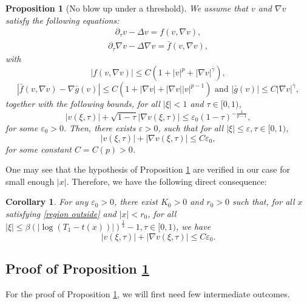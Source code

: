 \documentclass[11pt,a4paper]{article}
\newcommand{\1}{\mathbbm{1}}
\numberwithin{equation}{section}
\newtheorem{prp}[lemma]{Proposition}
\newtheorem{cor}[lemma]{Corollary}
\theoremstyle{remark}
\begin{document}
\begin{prp}[No blow up under a threshold]\label{prp bound v}
We assume that $v$ and $\nabla v$ satisfy the following equations:
\begin{equation}\label{ineq v}
\begin{split}
\partial_\tau v -\Delta v=f(v,\nabla v),
\end{split}
\end{equation}
\begin{equation}\label{ineq grad v}
\begin{split}
\partial_\tau \nabla v -\Delta \nabla v=\bar f(v,\nabla v),
\end{split}
\end{equation}
with $$|f(v,\nabla v)|\leq C(1+|v|^p+|\nabla v|^{\bar{\gamma}}),$$
$$|\bar f(v,\nabla v)-\nabla \bar g(v)|\leq C(1+|\nabla v|+|\nabla v||v|^{p-1}) \text{ and }|\bar g(v)|\leq C|\nabla v|^{\bar{\gamma}},$$
together with the following bounds, for all $ |\xi|<1$ and $\tau\in [0,1)$,
\begin{equation*}\label{bound v & nabla v}
|v(\xi,\tau)|+\sqrt{1-\tau}|\nabla v(\xi,\tau)|\leq \varepsilon_0(1-\tau)^{-\frac{1}{p-1}},
\end{equation*}
for some $\varepsilon_0>0$. Then, there exists $\varepsilon>0$, such that for all $|\xi|\leq \varepsilon,\tau \in [0,1)$,
$$|v(\xi,\tau)|+|\nabla v(\xi,\tau)|\leq C\varepsilon_0,$$
for some constant $C=C(p)>0$.
\end{prp}
One may see that the hypothesis of Proposition \ref{prp bound v} are verified in our case for small enough $|x|$. Therefore, we have the following direct consequence:
\begin{cor}\label{cor bound v, nabla v}
For any $\varepsilon_0 > 0$, there exist $K_0 > 0$ and $r_0 > 0$ such that, for all $x$ satisfying \eqref{region outside} and $|x| < r_0$, for all $|\xi|\leq\beta (|\log(T_1-t(x))|)^{\frac{1}{4}}-1,\tau \in [0,1)$, we have
\begin{equation}\label{bound v}
|v(\xi,\tau)|+|\nabla v(\xi,\tau)|\leq C\varepsilon_0.
\end{equation}
\end{cor}

\subsection{Proof of Proposition \ref{prp bound v}}
For the proof of Proposition \ref{prp bound v}, we will first need few intermediate outcomes.
\end{document}
